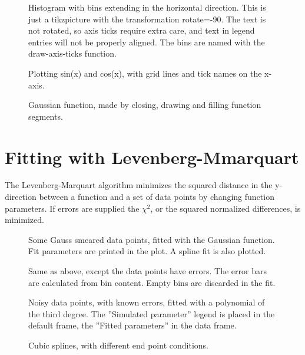 \documentclass{article}
\begin{document}
\begin{figure}[H]
\centering

\captionsetup{singlelinecheck=off}
\caption[asdf]{Histogram with bins extending in the horizontal direction. 
This is just a tikzpicture with the transformation rotate=-90. The text is not rotated, so axis ticks
require extra care, and text in legend entries will not be properly aligned.
The bins are named with the draw-axis-ticks function.}
\end{figure}
\begin{figure}[H]
\centering

\captionsetup{singlelinecheck=off}
\caption[asdf]{Plotting sin(x) and cos(x), with grid lines and tick names on the x-axis.}
\end{figure}
\begin{figure}[H]
\centering

\captionsetup{singlelinecheck=off}
\caption[asdf]{Gaussian function, made by closing, drawing and filling function segments.}
\end{figure}
\section{Fitting with Levenberg-Mmarquart}


The Levenberg-Marquart algorithm minimizes the squared distance in the y-direction
between a function and a set of data points by changing function parameters. 
If errors are supplied the $\chi^2$, or the squared normalized differences, is minimized.

\begin{figure}[H]
\centering

\captionsetup{singlelinecheck=off}
\caption[asdf]{Some Gauss smeared data points, fitted with the Gaussian function. Fit parameters are printed in the plot. 
A spline fit is also plotted.}
\end{figure}
\begin{figure}[H]
\centering

\captionsetup{singlelinecheck=off}
\caption[asdf]{Same as above, except the data points have errors. The error bars are calculated from bin content.
Empty bins are discarded in the fit.}
\end{figure}
\begin{figure}[H]
\centering

\captionsetup{singlelinecheck=off}
\caption[asdf]{Noisy data points, with known errors, fitted with a polynomial of the third degree. 
The ''Simulated parameter'' legend is placed in the default frame, the ''Fitted parameters'' 
in the data frame.}
\end{figure}
\begin{figure}[H]
\centering

\captionsetup{singlelinecheck=off}
\caption[asdf]{Cubic splines, with different end point conditions.}
\end{figure}
\end{document}

